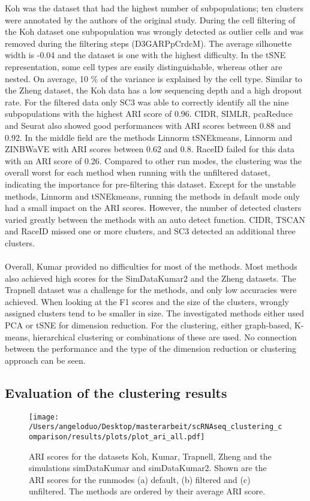\documentclass[12pt, a4paper]{article}\usepackage[]{graphicx}\usepackage[]{color}
\begin{document}
Koh was the dataset that had the highest number of subpopulations; ten clusters were annotated by the authors of the original study. During the cell filtering of the Koh dataset one subpopulation was wrongly detected as outlier cells and was removed during the filtering steps (D3GARPpCrdcM). The average silhouette width is -0.04 and the dataset is one with the highest difficulty. In the tSNE representation, some cell types are easily distinguishable, whereas other are nested. On average, 10 \% of the variance is explained by the cell type. Similar to the Zheng dataset, the Koh data has a low sequencing depth and a high dropout rate. For the filtered data only SC3 was able to correctly identify all the nine subpopulations with the highest ARI score of 0.96. CIDR, SIMLR, pcaReduce and Seurat also showed good performances with ARI scores between 0.88 and 0.92. In the middle field are the methods Linnorm tSNEkmeans, Linnorm and ZINBWaVE with ARI scores between 0.62 and 0.8. RaceID failed for this data with an ARI score of 0.26. Compared to other run modes, the clustering was the overall worst for each method when running with the unfiltered dataset, indicating the importance for pre-filtering this dataset. Except for the unstable methods, Linnorm and tSNEkmeans, running the methods in default mode only had a small impact on the ARI scores. However, the number of detected clusters varied greatly between the methods with an auto detect function. CIDR, TSCAN and RaceID missed one or more clusters, and SC3 detected an additional three clusters.
\paragraph{}

Overall, Kumar provided no difficulties for most of the methods. Most methods also achieved high scores for the SimDataKumar2 and the Zheng datasets. The Trapnell dataset was a challenge for the methods, and only low accuracies were achieved. When looking at the F1 scores and the size of the clusters, wrongly assigned clusters tend to be smaller in size. The investigated methods either used PCA or tSNE for dimension reduction. For the clustering, either graph-based, K-means, hierarchical clustering or combinations of these are used. No connection between the performance and the type of the dimension reduction or clustering approach can be seen.

\newpage

\subsection{Evaluation of the clustering results}
\begin{figure}[H]
\texttt{[image: /Users/angeloduo/Desktop/masterarbeit/scRNAseq\_clustering\_comparison/results/plots/plot\_ari\_all.pdf]}
\caption{ARI scores for the datasets Koh, Kumar, Trapnell, Zheng and the simulations simDataKumar and simDataKumar2. Shown are the ARI scores for the runmodes (a) default, (b) filtered and  (c) unfiltered. The methods are ordered by their average ARI score. }
\label{fig:ariall}
\end{figure}
\end{document}
